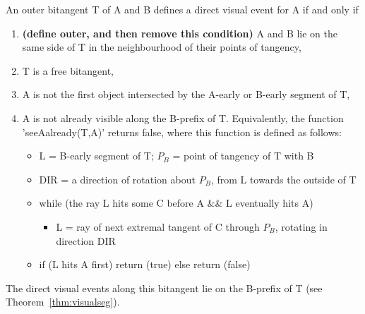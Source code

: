 \documentclass[12pt]{article}
\begin{document}
\begin{theorem}
\label{thm:directve}
An outer bitangent T of A and B defines a direct visual event for A if and only if
\begin{enumerate}
\item {\bf (define outer, and then remove this condition)} A and B lie on the same side of T in the neighbourhood of their points of tangency,
\item T is a free bitangent,
\item A is not the first object intersected by the A-early or B-early segment of T,
\item A is not already visible along the B-prefix of T.  Equivalently,
      the function 'seeAalready(T,A)' returns false, where this function is 
      defined as follows:
\begin{itemize}
\item L = B-early segment of T; $P_B$ = point of tangency of T with B
\item DIR = a direction of rotation about $P_B$, from L towards the outside of T
\item while (the ray L hits some C before A \&\& L eventually hits A)
\begin{itemize}
\item L = ray of next extremal tangent of C through $P_B$, rotating in direction DIR
\end{itemize}
\item if (L hits A first) return (true) else return (false) 
\end{itemize}
\end{enumerate}
The direct visual events along this bitangent lie on the B-prefix of T
(see Theorem~\ref{thm:visualseg}).
\end{theorem}
\end{document}
